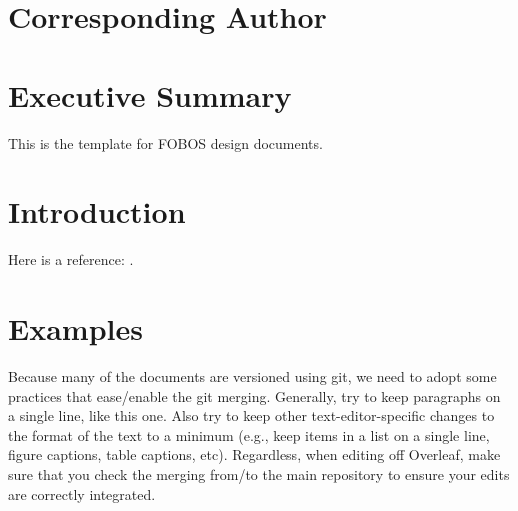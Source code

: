 \documentclass[11pt,a4paper,twoside,onecolumn,openany,final,oldfontcommands]{memoir}
\begin{document}


\frontmatter

\thispagestyle{empty}  %

\clearpage
\setupmaintoc
\tableofcontents 

\clearpage
\listoffigures

\clearpage
\listoftables

\chapter{Corresponding Author}
%



\chapter{Executive Summary}

This is the template for FOBOS design documents.



\mainmatter

\chapter{Introduction}

Here is a reference: \citet{2019BAAS...51g.198B}.

\chapter{Examples}

Because many of the documents are versioned using git, we need to adopt some practices that ease/enable the git merging.  Generally, try to keep paragraphs on a single line, like this one.  Also try to keep other text-editor-specific changes to the format of the text to a minimum (e.g., keep items in a list on a single line, figure captions, table captions, etc).  Regardless, when editing off Overleaf, make sure that you check the merging from/to the main repository to ensure your edits are correctly integrated.
\end{document}
